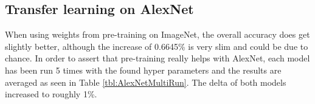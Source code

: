 \begin{table}[h]
    \caption{Accuracy (\%) for several learning rates and lr-decays for AlexNet as a baseline.}
    \centering
    \begin{small}
    \textsc{
    }
    \end{small}
    \vspace{-3.9mm}
    \label{tbl:alexnet-baseline}
\end{table}

\subsection{Transfer learning on AlexNet}

When using weights from pre-training on ImageNet, the overall accuracy does get slightly better, although the increase of 0.6645\% is very slim and could be due to chance. In order to assert that pre-training really helps with AlexNet, each model has been run 5 times with the found hyper parameters and the results are averaged as seen in Table \ref{tbl:AlexNetMultiRun}. The delta of both models increased to roughly 1\%.


